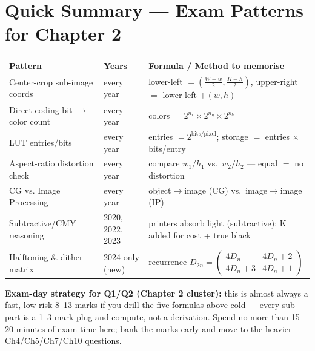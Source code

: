 \documentclass[12pt, a4paper]{article}
\newenvironment{notesbox}{\begin{mdframed}[style=notesframe]}{\end{mdframed}}
\begin{document}
\section{Quick Summary --- Exam Patterns for Chapter 2}

\begin{center}
\renewcommand{\arraystretch}{1.3}
\begin{tabular}{p{5.5cm}|p{2.5cm}|p{6cm}}
\toprule
\textbf{Pattern} & \textbf{Years} & \textbf{Formula / Method to memorise} \\
\midrule
Center-crop sub-image coords & every year & lower-left $=\left(\frac{W-w}{2},\frac{H-h}{2}\right)$, upper-right $=$ lower-left $+(w,h)$ \\
Direct coding bit $\to$ color count & every year & colors $=2^{n_r}\times2^{n_g}\times2^{n_b}$ \\
LUT entries/bits & every year & entries $=2^{\text{bits/pixel}}$; storage $=$ entries $\times$ bits/entry \\
Aspect-ratio distortion check & every year & compare $w_1/h_1$ vs.\ $w_2/h_2$ --- equal $=$ no distortion \\
CG vs. Image Processing & every year & object$\to$image (CG) vs.\ image$\to$image (IP) \\
Subtractive/CMY reasoning & 2020, 2022, 2023 & printers absorb light (subtractive); K added for cost + true black \\
Halftoning \& dither matrix & 2024 only (new) & recurrence $D_{2n}=\begin{pmatrix}4D_n&4D_n+2\\4D_n+3&4D_n+1\end{pmatrix}$ \\
\bottomrule
\end{tabular}
\end{center}

\begin{notesbox}
\textbf{Exam-day strategy for Q1/Q2 (Chapter 2 cluster):} this is almost always a fast, low-risk 8--13 marks if you drill the five formulas above cold — every sub-part is a 1--3 mark plug-and-compute, not a derivation. Spend no more than 15--20 minutes of exam time here; bank the marks early and move to the heavier Ch4/Ch5/Ch7/Ch10 questions.
\end{notesbox}
\end{document}
